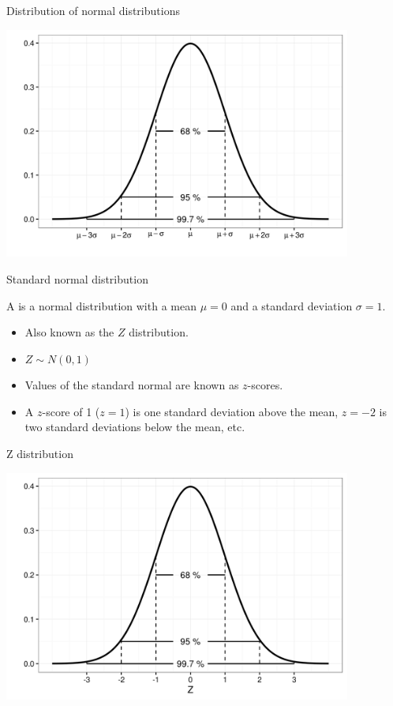 \documentclass[xcolor=table]{beamer}
\begin{document}
\begin{frame}{Distribution of normal distributions}

\bigskip
{\centering
\includegraphics[width=4.5in]{../images/ch6_normal}
\par}

\end{frame}

\begin{frame}{Standard normal distribution}
\begin{block}{}
{\large A  is a normal distribution with a mean $\mu=0$ and a standard deviation $\sigma =1$.  }
\begin{itemize}
\pause\item Also known as the $Z$ distribution.
\pause\item $Z \sim N(0,1)$
\pause\item Values of the standard normal are known as $z$-scores.
\pause\item A $z$-score of 1 ($z=1$) is one standard deviation above the mean, $z=-2$ is two standard deviations below the mean, etc.
\end{itemize}
\end{block}
\end{frame}

\begin{frame}{Z distribution}

\bigskip
{\centering
\includegraphics[width=4.5in]{../images/ch6_zdist}
\par}
\end{frame}
\end{document}
